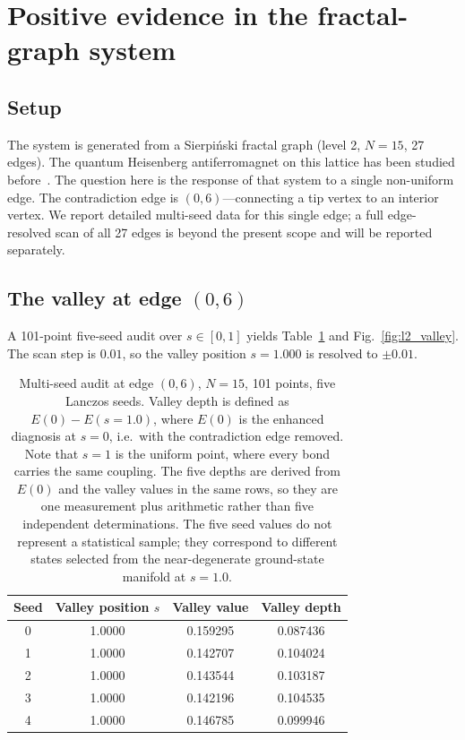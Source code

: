 \documentclass[pdflatex,sn-mathphys-num,iicol]{sn-jnl}
\begin{document}
\section{Positive evidence in the fractal-graph system}

\subsection{Setup}

The system is generated from a Sierpi\'{n}ski fractal graph (level 2, $N=15$, 27 edges). The quantum Heisenberg antiferromagnet on this lattice has been studied before~\cite{Voigt1998,Voigt2001,Voigt2004,Zou2023}. The question here is the response of that system to a single non-uniform edge. The contradiction edge is $(0,6)$---connecting a tip vertex to an interior vertex. We report detailed multi-seed data for this single edge; a full edge-resolved scan of all 27 edges is beyond the present scope and will be reported separately.

\subsection{The valley at edge $(0,6)$}

A 101-point five-seed audit over $s\in[0,1]$ yields Table~\ref{tab:l2_valley} and Fig.~\ref{fig:l2_valley}. The scan step is $0.01$, so the valley position $s=1.000$ is resolved to $\pm0.01$.

\begin{table}[t]
\centering
\caption{Multi-seed audit at edge $(0,6)$, $N=15$, 101 points, five Lanczos seeds. Valley depth is defined as $E(0)-E(s=1.0)$, where $E(0)$ is the enhanced diagnosis at $s=0$, i.e.\ with the contradiction edge removed. Note that $s=1$ is the uniform point, where every bond carries the same coupling. The five depths are derived from $E(0)$ and the valley values in the same rows, so they are one measurement plus arithmetic rather than five independent determinations. The five seed values do not represent a statistical sample; they correspond to different states selected from the near-degenerate ground-state manifold at $s=1.0$.}
\label{tab:l2_valley}
\begin{tabular}{cccc}
\toprule
Seed & Valley position $s$ & Valley value & Valley depth \\
\midrule
0 & 1.0000 & 0.159295 & 0.087436 \\
1 & 1.0000 & 0.142707 & 0.104024 \\
2 & 1.0000 & 0.143544 & 0.103187 \\
3 & 1.0000 & 0.142196 & 0.104535 \\
4 & 1.0000 & 0.146785 & 0.099946 \\
\bottomrule
\end{tabular}
\end{table}
\end{document}
